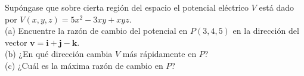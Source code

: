 \item Supóngase que sobre cierta región del espacio el potencial eléctrico $V$ está dado por $V(x, y, z) = 5x^2 - 3xy + xyz$. \\
(a) Encuentre la razón de cambio del potencial en $P(3, 4, 5)$ en la dirección del vector $\mathbf{v} = \mathbf{i} + \mathbf{j} - \mathbf{k}$. \\
(b) ¿En qué dirección cambia $V$ más rápidamente en $P$? \\
(c) ¿Cuál es la máxima razón de cambio en $P$?
